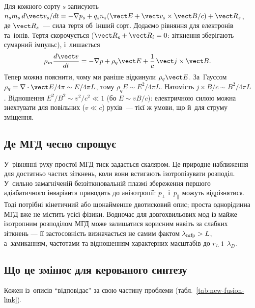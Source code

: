 Для кожного сорту $s$ записують $n_sm_s\,d\vect v_s/dt=-\nabla p_s+q_sn_s(\vect E+\vect
v_s\times\vect B/c)+\vect R_s$, де $\vect R_s$~--- сила тертя об~інший сорт. Додаємо
рівняння для електронів та~іонів. Тертя скорочується ($\vect R_e+\vect R_i=0$: зіткнення
зберігають сумарний імпульс), і~лишається
\begin{equation*}
	\rho_m\frac{d\vect v}{dt}=-\nabla p+\rho_q\vect E+\frac1c\,\vect j\times\vect B.
\end{equation*}
Тепер можна пояснити, чому ми раніше відкинули $\rho_q\vect E$. За~Гауссом
$\rho_q=\nabla\cdot\vect E/4\pi\sim E/4\pi L$, тому $\rho_qE\sim E^2/4\pi L$. Натомість
$j\times B/c\sim B^2/4\pi L$. Відношення $E^2/B^2\sim v^2/c^2\ll1$ (бо $E\sim vB/c$):
електричною силою можна знехтувати для повільних ($v\ll c$) рухів~--- тієї ж умови, що
й~для струму зміщення.



\subsection{Де МГД чесно спрощує}



У~рівнянні руху простої МГД тиск задається скаляром. Це природне наближення для достатньо
частих зіткнень, коли вони встигають ізотропізувати розподіл. У~сильно замагніченій
беззіткнювальній плазмі збереження першого адіабатичного інваріанта приводить до
анізотропії: $p_\perp$ і~$p_\parallel$ можуть відрізнятися. Тоді потрібні кінетичний або
щонайменше двотисковий опис; проста однорідинна МГД вже не містить усієї фізики. Водночас
для довгохвильових мод із майже ізотропним розподілом МГД може залишатися корисним навіть
за слабких зіткнень — її застосовність визначається не самим фактом $\lambda_{\rm mfp}>L$,
а~замиканням, частотами та відношенням характерних масштабів до $r_L$ і~$\lambda_D$.



\subsection{Що це змінює для керованого синтезу}



Кожен із~описів \enquote{відповідає} за свою частину проблеми
(табл.~\ref{tab:new-fusion-link}).

